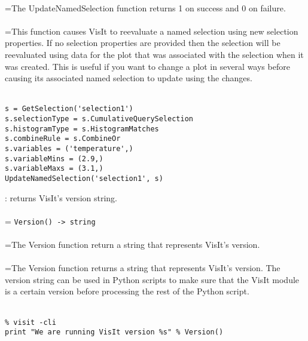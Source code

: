 \documentclass[10pt,a4paper]{report}
\begin{document}
 \\ 
\hangindent=\parindent The UpdateNamedSelection function returns 1 on success and 0 on failure. \\[-3mm] 

 \\ 
\hangindent=\parindent This function causes VisIt to reevaluate a named selection using new selection properties. If no selection properties are provided then the selection will be reevaluated using data for the plot that was associated with the selection when it was created. This is useful if you want to change a plot in several ways before causing its associated named selection to update using the changes. \\[-3mm] 

\\[-6mm]
\begin{verbatim}s = GetSelection('selection1')
s.selectionType = s.CumulativeQuerySelection
s.histogramType = s.HistogramMatches
s.combineRule = s.CombineOr
s.variables = ('temperature',)
s.variableMins = (2.9,)
s.variableMaxs = (3.1,)
UpdateNamedSelection('selection1', s)
\end{verbatim}
\newpage


{}
: returns VisIt's version string.\\[-3mm]

 \\ 
\hangindent=\parindent 
\verb!Version() -> string!\\ [-3mm]

 \\ 
\hangindent=\parindent The Version function return a string that represents VisIt's version. \\[-3mm] 

 \\ 
\hangindent=\parindent The Version function returns a string that represents VisIt's version. The version string can be used in Python scripts to make sure that the VisIt module is a certain version before processing the rest of the Python script. \\[-3mm] 

\\[-6mm]
\begin{verbatim}% visit -cli
print "We are running VisIt version %s" % Version()
\end{verbatim}
\newpage
\end{document}
